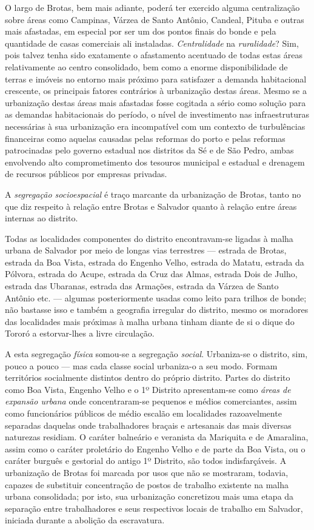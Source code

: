 O largo de Brotas, bem mais adiante, poderá ter exercido alguma centralização sobre áreas como Campinas, Várzea de Santo Antônio, Candeal, Pituba e outras mais afastadas, em especial por ser um dos pontos finais do bonde e pela quantidade de casas comerciais ali instaladas. \textit{Centralidade} na \textit{ruralidade}? Sim, pois talvez tenha sido exatamente o afastamento acentuado de todas estas áreas relativamente ao centro consolidado, bem como a enorme disponibilidade de terras e imóveis no entorno mais próximo para satisfazer a demanda habitacional crescente, os principais fatores contrários à urbanização destas áreas. Mesmo se a urbanização destas áreas mais afastadas fosse cogitada a sério como solução para as demandas habitacionais do período, o nível de investimento nas infraestruturas necessárias à sua urbanização era incompatível com um contexto de turbulências financeiras como aquelas causadas pelas reformas do porto e pelas reformas patrocinadas pelo governo estadual nos distritos da Sé e de São Pedro, ambas envolvendo alto comprometimento dos tesouros municipal e estadual e drenagem de recursos públicos por empresas privadas.

A \textit{segregação socioespacial} é traço marcante da urbanização de Brotas, tanto no que diz respeito à relação entre Brotas e Salvador quanto à relação entre áreas internas ao distrito. 

Todas as localidades componentes do distrito encontravam-se ligadas à malha urbana de Salvador por meio de longas vias terrestres --- estrada de Brotas, estrada da Boa Vista, estrada do Engenho Velho, estrada do Matatu, estrada da Pólvora, estrada do Acupe, estrada da Cruz das Almas, estrada Dois de Julho, estrada das Ubaranas, estrada das Armações, estrada da Várzea de Santo Antônio etc. --- algumas posteriormente usadas como leito para trilhos de bonde; não bastasse isso e também a geografia irregular do distrito, mesmo os moradores das localidades mais próximas à malha urbana tinham diante de si o dique do Tororó a estorvar-lhes a livre circulação. 

A esta segregação \textit{física} somou-se a segregação \textit{social}. Urbaniza-se o distrito, sim, pouco a pouco --- mas cada classe social urbaniza-o a seu modo. Formam territórios socialmente distintos dentro do próprio distrito. Partes do distrito como Boa Vista, Engenho Velho e o 1º Distrito apresentam-se como \textit{áreas de expansão urbana} onde concentraram-se pequenos e médios comerciantes, assim como funcionários públicos de médio escalão em localidades razoavelmente separadas daquelas onde trabalhadores braçais e artesanais das mais diversas naturezas residiam. O caráter balneário e veranista da Mariquita e de Amaralina, assim como o caráter proletário do Engenho Velho e de parte da Boa Vista, ou o caráter burguês e gestorial do antigo 1º Distrito, são todos indisfarçáveis. A urbanização de Brotas foi marcada por usos que não se mostraram, todavia, capazes de substituir concentração de postos de trabalho existente na malha urbana consolidada; por isto, sua urbanização concretizou mais uma etapa da separação entre trabalhadores e seus respectivos locais de trabalho em Salvador, iniciada durante a abolição da escravatura. 

